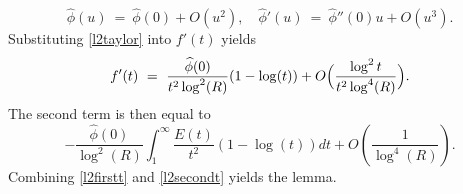 \documentclass[11pt, reqno]{amsart}
\makeatletter
\renewenvironment{proof}[1][\proofname]{\par
  \vspace{-.7\topsep}%
  \pushQED{\qed}%
  \normalfont
  \topsep0pt \partopsep0pt %
  \trivlist
  \item[\hskip\labelsep
        \itshape
    #1\@addpunct{.}]\ignorespaces
}{%
  \popQED\endtrivlist\@endpefalse
  \addvspace{6pt plus 6pt} %
}
\theoremstyle{definition}
\theoremstyle{remark}
\numberwithin{equation}{section}
\renewcommand{\hat}{\widehat}
\makeatother
\begin{document}
\begin{proof}
\begin{equation}
\hat\phi(u) \ = \ \hat\phi(0)+O(u^2), \quad
\hat\phi'(u) \ = \ \hat\phi''(0)u+O(u^3).  \label{l2taylor}
\end{equation}
Substituting \eqref{l2taylor} into $f'(t)$ yields
\begin{equation}
f'(t) \ = \ \frac{\hat\phi(0)}{t^{2}\log^2(R)}(1-\log(t))
+O\Bigl(\frac{\log^2t}{t^{2}\log^4(R)}\Bigr).
\label{l2firstt}
\end{equation}
The second term is then equal to
\begin{equation}
-\frac{\hat\phi(0)}{\log^2(R)}\int_1^{\infty}\frac{E(t)}{t^2}(1-\log(t))dt + O\left(\frac{1}{\log^4(R)}\right).
\label{l2secondt}
\end{equation}
Combining \eqref{l2firstt} and \eqref{l2secondt} yields the lemma.

\end{proof}
\end{document}
